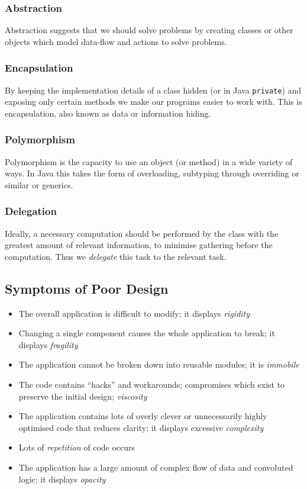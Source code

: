 \documentclass[12pt]{report}
\newcommand{\code}[1]{\lstinline{#1}}
\begin{document}
\begin{flushleft}
\subsubsection*{Abstraction}

Abstraction suggests that we should solve problems by creating classes or other
objects which model data-flow and actions to solve problems.

\subsubsection*{Encapsulation}

By keeping the implementation details of a class hidden (or in Java
\code{private}) and exposing only certain methods we make our programs easier
to work with. This is encapsulation, also known as data or information hiding.

\subsubsection*{Polymorphism}

Polymorphism is the capacity to use an object (or method) in a wide variety of
ways. In Java this takes the form of overloading, subtyping through overriding
or similar or generics.

\subsubsection*{Delegation}

Ideally, a necessary computation should be performed by the class with the
greatest amount of relevant information, to minimise gathering before the
computation. Thus we \textit{delegate} this task to the relevant task.

\subsection*{Symptoms of Poor Design}

\begin{itemize}
    \item The overall application is difficult to modify; it displays
        \textit{rigidity}
    \item Changing a single component causes the whole application to break;
        it displays \textit{fragility}
    \item The application cannot be broken down into reusable modules; it is
        \textit{immobile}
    \item The code contains ``hacks'' and workarounds; compromises which exist
        to preserve the initial design; \textit{viscosity}
    \item The application contains lots of overly clever or unnecessarily
        highly optimised code that reduces clarity; it displays excessive
        \textit{complexity}
    \item Lots of \textit{repetition} of code occurs
    \item The application has a large amount of complex flow of data and
        convoluted logic; it displays \textit{opacity}
\end{itemize}


\end{flushleft}
\end{document}
